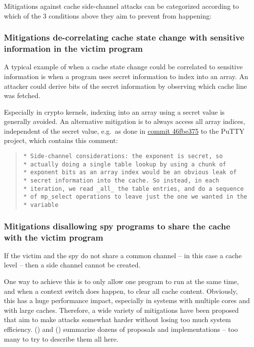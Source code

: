 \documentclass[
  a4paper,
]{report}
\begin{document}
Mitigations against cache side-channel attacks can be categorized
according to which of the 3 conditions above they aim to prevent from
happening:

\subsubsection{Mitigations de-correlating cache state change with
sensitive information in the victim
program}\label{mitigations-de-correlating-cache-state-change-with-sensitive-information-in-the-victim-program}

A typical example of when a cache state change could be correlated to
sensitive information is when a program uses secret information to index
into an array. An attacker could derive bits of the secret information
by observing which cache line was fetched.

Especially in crypto kernels, indexing into an array using a secret
value is generally avoided. An alternative mitigation is to always
access all array indices, independent of the secret value, e.g.~as done
in
\href{https://git.tartarus.org/?p=simon/putty.git;a=commitdiff;h=46fbe375bf}{commit
46fbe375} to the PuTTY project, which contains this comment:

\begin{quote}
\begin{verbatim}
* Side-channel considerations: the exponent is secret, so
* actually doing a single table lookup by using a chunk of
* exponent bits as an array index would be an obvious leak of
* secret information into the cache. So instead, in each
* iteration, we read _all_ the table entries, and do a sequence
* of mp_select operations to leave just the one we wanted in the
* variable
\end{verbatim}
\end{quote}

\subsubsection{Mitigations disallowing spy programs to share the cache
with the victim
program}\label{mitigations-disallowing-spy-programs-to-share-the-cache-with-the-victim-program}

If the victim and the spy do not share a common channel -- in this case
a cache level -- then a side channel cannot be created.

One way to achieve this is to only allow one program to run at the same
time, and when a context switch does happen, to clear all cache content.
Obviously, this has a huge performance impact, especially in systems
with multiple cores and with large caches. Therefore, a wide variety of
mitigations have been proposed that aim to make attacks somewhat harder
without losing too much system efficiency.
() and
() summarize dozens of proposals
and implementations -- too many to try to describe them all here.
\end{document}
